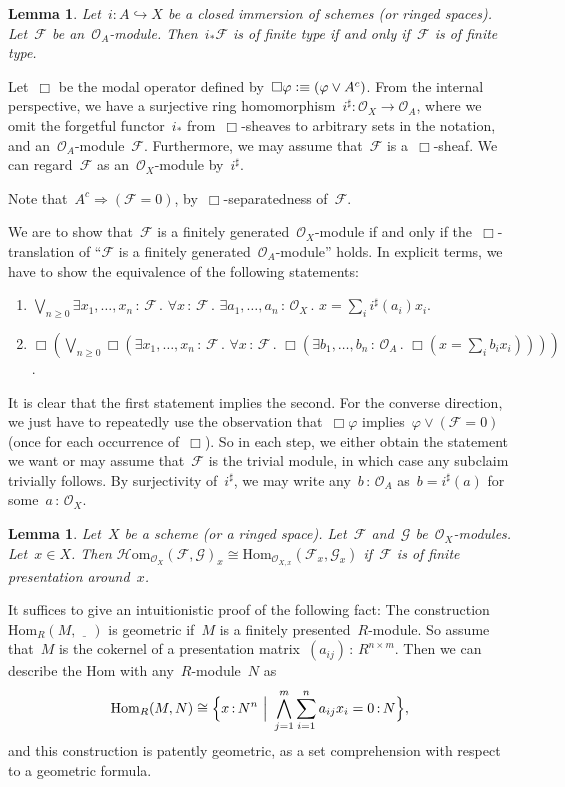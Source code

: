 \documentclass[10pt,reqno,a4paper]{amsbook}
\makeatletter
\theoremstyle{definition}
\theoremstyle{plain}
\newtheorem{lemma}[defn]{Lemma}
\theoremstyle{remark}
\newcommand{\F}{\mathcal{F}}
\newcommand{\G}{\mathcal{G}}
\renewcommand{\O}{\mathcal{O}}
\newcommand{\Hom}{\mathrm{Hom}}
\newcommand{\HOM}{\mathcal{H}\mathrm{om}}
\newcommand{\placeholder}{\underline{\quad}}
\newcommand{\?}{\,{:}\,}
\renewcommand{\_}{\mathpunct{.}\,}
\newcommand{\defequiv}{\vcentcolon\equiv}
\renewenvironment{proof}[1][\proofname]{\par
  \pushQED{\qed}%
  \normalfont \topsep6\p@\@plus6\p@\relax
  \trivlist
  \item[\hskip\labelsep
        \itshape
    #1\@addpunct{.}]\ignorespaces
}{%
  \popQED\endtrivlist\@endpefalse
}
\makeatother
\begin{document}
\begin{lemma}\label{lemma:pushforward-finite-type}
Let~$i : A \hookrightarrow X$ be a closed immersion of schemes (or
ringed spaces). Let~$\F$ be an~$\O_A$-module. Then~$i_*\F$ is of finite type if
and only if~$\F$ is of finite type.\end{lemma}
\begin{proof}
Let~$\Box$ be the modal operator defined by~$\Box\varphi \defequiv (\varphi \vee
A^c)$. From the internal perspective, we have a surjective ring homomorphism~$i^\sharp
: \O_X \to \O_A$, where we omit the forgetful functor~$i_*$ from~$\Box$-sheaves
to arbitrary sets in the notation, and an~$\O_A$-module~$\F$. Furthermore, we
may assume that~$\F$ is a~$\Box$-sheaf. We can regard~$\F$ as an~$\O_X$-module
by~$i^\sharp$.

Note that~$A^c \Rightarrow (\F = 0)$, by~$\Box$-separatedness of~$\F$.

We are to show that~$\F$ is a finitely generated~$\O_X$-module if and only if
the~$\Box$-translation of ``$\F$ is a finitely generated~$\O_A$-module'' holds.
In explicit terms, we have to show the equivalence of the following statements:
\begin{enumerate}
\item $\bigvee_{n \geq 0} \exists x_1,\ldots,x_n\?\F\_
  \forall x\?\F\_ \exists a_1,\ldots,a_n\?\O_X\_ x = \sum_i i^\sharp(a_i) x_i$.
\item $\Box(\bigvee_{n \geq 0} \Box(\exists x_1,\ldots,x_n\?\F\_
  \forall x\?\F\_ \Box(\exists b_1,\ldots,b_n\?\O_A\_ \Box(
    x = \sum_i b_i x_i))))$.
\end{enumerate}
It is clear that the first statement implies the second. For the converse
direction, we just have to repeatedly use the observation that~$\Box\varphi$
implies~$\varphi \vee (\F = 0)$ (once for each occurrence of~$\Box$). So in each
step, we either obtain the statement we want or may assume
that~$\F$ is the trivial module, in which case any subclaim trivially follows. By
surjectivity of~$i^\sharp$, we may write any~$b\?\O_A$ as~$b =
i^\sharp(a)$ for some~$a\?\O_X$.
\end{proof}

\begin{lemma}\label{lemma:fp-hom-geometric}
Let~$X$ be a scheme (or a ringed space). Let~$\F$ and~$\G$ be~$\O_X$-modules. Let~$x
\in X$. Then $\HOM_{\O_X}(\F,\G)_x \cong \Hom_{\O_{X,x}}(\F_x,\G_x)$ if~$\F$ is
of finite presentation around~$x$.\end{lemma}
\begin{proof}It suffices to give an intuitionistic proof of the following fact:
The construction~$\Hom_R(M,\placeholder)$ is geometric if~$M$ is a finitely
presented~$R$-module. So assume that~$M$ is the cokernel of a presentation
matrix~$(a_{ij}) \? R^{n \times m}$. Then we can describe the Hom with
any~$R$-module~$N$ as
\[ \Hom_R(M,N) \cong \Bigl\{ x \? N^n \ \Big|\ \bigwedge_{j=1}^m \sum_{i=1}^n a_{ij}
x_i = 0 \? N \Bigr\}, \]
and this construction is patently geometric, as a set comprehension with respect to
a geometric formula.
\end{proof}
\end{document}
